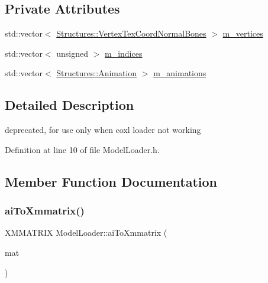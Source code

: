 \subsection*{Private Attributes}
\begin{DoxyCompactItemize}
\item 
std\+::vector$<$ \mbox{\hyperlink{struct_structures_1_1_vertex_tex_coord_normal_bones}{Structures\+::\+Vertex\+Tex\+Coord\+Normal\+Bones}} $>$ \mbox{\hyperlink{class_model_loader_ac87b9662dae9c00b140bc90c30c088ee}{m\+\_\+vertices}}
\item 
std\+::vector$<$ unsigned $>$ \mbox{\hyperlink{class_model_loader_a6d63371db7677b60c2c000f23c7fb8f6}{m\+\_\+indices}}
\item 
std\+::vector$<$ \mbox{\hyperlink{struct_structures_1_1_animation}{Structures\+::\+Animation}} $>$ \mbox{\hyperlink{class_model_loader_a2b9cf4d8fe3432ddc656651057c78860}{m\+\_\+animations}}
\end{DoxyCompactItemize}


\subsection{Detailed Description}
deprecated, for use only when coxl loader not working 

Definition at line 10 of file Model\+Loader.\+h.



\subsection{Member Function Documentation}
\mbox{\label{class_model_loader_ab142e176c572ea327518f01fb2f0630b}} 
\subsubsection{\texorpdfstring{ai\+To\+Xmmatrix()}{aiToXmmatrix()}}
{\footnotesize\ttfamily X\+M\+M\+A\+T\+R\+IX Model\+Loader\+::ai\+To\+Xmmatrix (\begin{DoxyParamCaption}\item[{ai\+Matrix4x4}]{mat }\end{DoxyParamCaption})\hspace{0.3cm}{\ttfamily [private]}}



